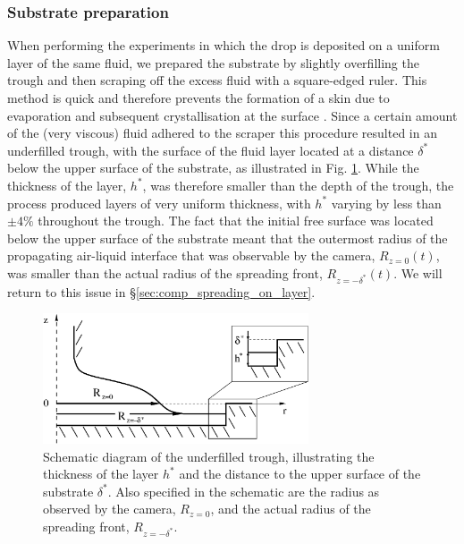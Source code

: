 \documentclass[aip,graphicx]{revtex4-1}
\begin{document}
\subsubsection{Substrate preparation\label{sec:creating_layer}}
When performing the experiments in which the drop is 
deposited on a uniform layer of the same fluid, we prepared the
substrate by slightly overfilling the trough and then scraping
off the excess fluid with a square-edged ruler. 
This method is quick and therefore prevents the formation of a skin
due to evaporation and subsequent crystallisation at the surface \cite{lees2012sugar,edwards2000science}.
Since a certain amount of the (very viscous) fluid 
adhered to the scraper this procedure resulted in an underfilled trough, 
with the surface of the fluid layer located at a distance $\delta^*$ 
below the upper surface of the substrate, as illustrated in Fig. 
\ref{fig:axisym_drop_nozzle_gap}. While the thickness of the layer, 
$h^*$, was therefore smaller than the depth of the trough, the
process produced layers of very uniform thickness, with
$h^*$ varying by less than $\pm 4\%$ throughout the trough. 
The fact that the initial free surface was located below the
upper surface of the substrate meant that the outermost radius
of the propagating air-liquid interface that was observable by the camera,
$R_{z=0}(t)$, was smaller than the actual radius of the spreading front,
 $R_{z=-\delta^*}(t)$.
We will return to this issue in \S \ref{sec:comp_spreading_on_layer}.

\begin{figure}[!ht]
\centering
\includegraphics[width=0.7\textwidth]{figures/axisym_drop_nozzle_gap_arrows.eps}
\caption{Schematic diagram of the underfilled trough, illustrating the
thickness of the layer $h^*$ and the distance to the upper surface of
the substrate $\delta^*$. Also specified in the schematic are the
radius as observed by the camera, $R_{z=0}$, and the actual radius of
the spreading front, $R_{z=-\delta^*}$.}
\label{fig:axisym_drop_nozzle_gap}
\end{figure}
 
\end{document}
